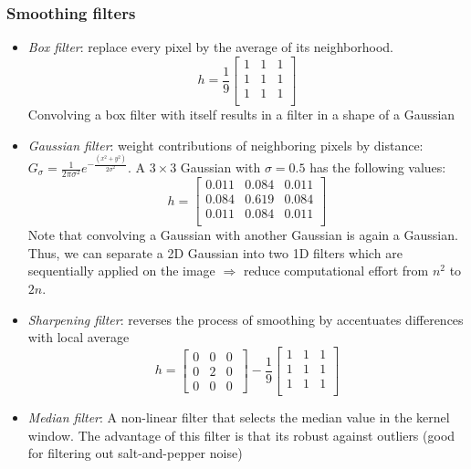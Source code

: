 \subsubsection{Smoothing filters}
\begin{itemize}
	\item \textit{Box filter}: replace every pixel by the average of its neighborhood. 
	$$h = \frac{1}{9}\left[\begin{array}{ccc}
	1 & 1 & 1\\
	1 & 1 & 1\\
	1 & 1 & 1\\
	\end{array}\right]$$
	Convolving a box filter with itself results in a filter in a shape of a Gaussian
	\item \textit{Gaussian filter}: weight contributions of neighboring pixels by distance: $G_\sigma = \frac{1}{2\pi \sigma^2} e^{-\frac{(x^2 +y^2)}{2\sigma^2 }}$. A $3\times 3$ Gaussian with $\sigma=0.5$ has the following values:
	$$h= \left[\begin{array}{ccc}
	0.011 & 0.084 & 0.011\\
	0.084 & 0.619 & 0.084\\
	0.011 & 0.084 & 0.011\\
	\end{array}\right]$$
	Note that convolving a Gaussian with another Gaussian is again a Gaussian. Thus, we can separate a 2D Gaussian into two 1D filters which are sequentially applied on the image $\Rightarrow$ reduce computational effort from $n^2$ to $2n$.
	\item \textit{Sharpening filter}: reverses the process of smoothing by accentuates differences with local average
	$$h = \left[\begin{array}{ccc}
	0 & 0 & 0\\
	0 & 2 & 0\\
	0 & 0 & 0\
	\end{array}\right]-\frac{1}{9}\left[\begin{array}{ccc}
	1 & 1 & 1\\
	1 & 1 & 1\\
	1 & 1 & 1\\
	\end{array}\right]$$
	\item \textit{Median filter}: A non-linear filter that selects the median value in the kernel window. The advantage of this filter is that its robust against outliers (good for filtering out salt-and-pepper noise)
\end{itemize}
